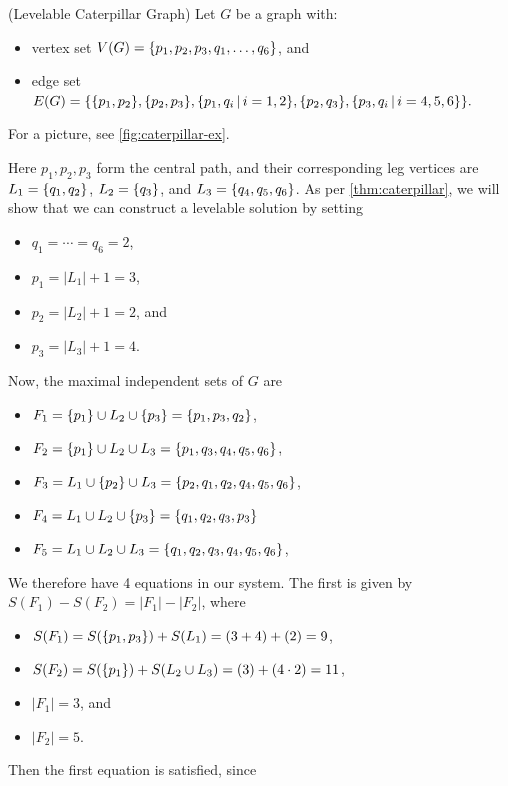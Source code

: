\begin{example} \label{ex:levelable-caterpillar}(Levelable Caterpillar Graph) 
Let $G$ be a graph with:
\begin{itemize}
\item vertex set $V(G) = \{ p_1, p_2, p_3, q_1, \dots, q_6 \}$, and 
\item edge set $E(G) = \{ 
\{ p_1, p_2 \},
\{ p_2, p_3 \},
\{ p_1, q_i \, | \, i = 1, 2 \},
\{ p_2, q_3 \},
\{ p_3, q_i \, | \, i = 4, 5, 6 \}
 \}.$
\end{itemize}
For a picture, see \autoref{fig:caterpillar-ex}. 

Here $p_1, p_2, p_3$ form the central path, and their corresponding leg vertices are $L_1 = \{ q_1, q_2 \}$, $L_2 = \{ q_3 \}$, and $L_3 = \{ q_4, q_5, q_6 \}$. As per \autoref{thm:caterpillar}, we will show that we can construct a levelable solution by setting
\begin{itemize}
\item $q_1 = \cdots = q_6 = 2$, 
\item $p_1 = |L_1| + 1 = 3$,
\item $p_2 = |L_2| + 1 = 2$, and
\item $p_3 = |L_3| + 1 = 4$.
\end{itemize}
Now, the maximal independent sets of $G$ are
\begin{itemize}
\item $F_1 = \{ p_1 \} \cup L_2 \cup \{ p_3 \} = \{ p_1, p_3, q_2 \}$,
\item $F_2 = \{ p_1 \} \cup L_2 \cup L_3 = \{ p_1, q_3, q_4, q_5, q_6 \}$,
\item $F_3 = L_1 \cup \{ p_2 \} \cup L_3 = \{ p_2, q_1, q_2, q_4, q_5, q_6 \}$,
\item $F_4 = L_1 \cup L_2 \cup \{ p_3 \} = \{ q_1, q_2, q_3, p_3 \}$
\item $F_5 = L_1 \cup L_2 \cup L_3 = \{ q_1, q_2, q_3, q_4, q_5, q_6 \}$,
\end{itemize}
We therefore have 4 equations in our system. The first is given by $S(F_1) - S(F_2) = |F_1| - |F_2|$, where 
\begin{itemize}
\item $S(F_1) = S(\{ p_1, p_3 \}) + S(L_1) = (3 + 4) + (2) = 9$,
\item $S(F_2) = S(\{ p_1 \}) + S(L_2 \cup L_3) =  (3) + (4 \cdot 2) = 11$,
\item $|F_1| = 3$, and
\item $|F_2| = 5$. 
\end{itemize} 
Then the first equation is satisfied, since

\end{example}
